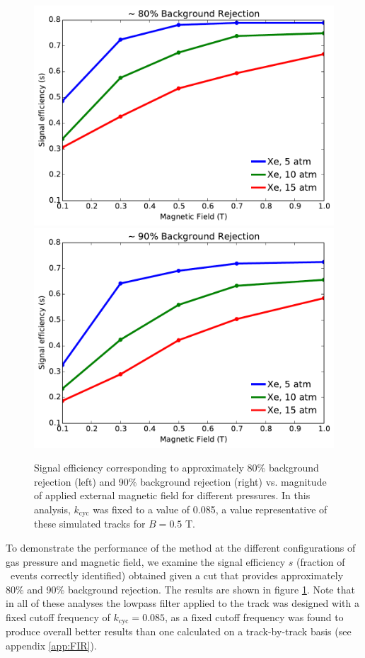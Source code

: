 \documentclass{JINST}
\begin{document}
\begin{figure}[!htb]
	\centering
	\includegraphics[scale=0.6]{fig/eff_vs_b_80.pdf} \\
	\includegraphics[scale=0.6]{fig/eff_vs_b_90.pdf}
	\caption{\label{fig_config}Signal efficiency corresponding to approximately 80\% background rejection (left) and 90\% background rejection (right) vs. magnitude of applied external magnetic field for different pressures.  In this analysis, $k_{\mathrm{cyc}}$ was fixed to a value of 0.085, a value representative of these simulated tracks for $B = 0.5$ T.}  %
\end{figure}

To demonstrate the performance of the method at the different configurations of gas pressure and magnetic 
field, we examine the signal efficiency $s$ (fraction of \bbonu\ events correctly identified) obtained 
given a cut that provides approximately 80\% and 90\% background rejection.  The results are shown in figure 
\ref{fig_config}.  Note that in all of these analyses the lowpass filter applied to the track was designed with
a fixed cutoff frequency of $k_{\mathrm{cyc}} = 0.085$, as a fixed cutoff frequency was found to produce overall
better results than one calculated on a track-by-track basis (see appendix \ref{app:FIR}).  
\end{document}
